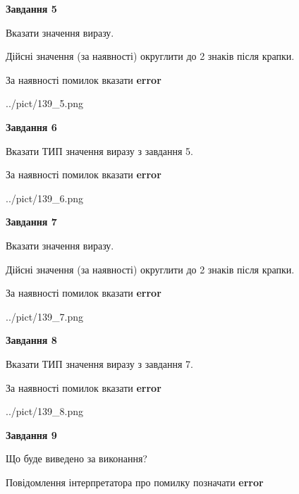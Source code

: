 \documentclass[11pt, ukrainian]{article}
\begin{document}
{\begin {large}
{\begin {center}\textbf{Завдання 5}\end {center}}\par
Вказати значення виразу. \par
Дійсні значення (за наявності) округлити до 2 знаків після крапки. \par
За наявності помилок вказати \textbf{error}

\begin{center}
	{../pict/139_5.png}
\end{center}
\newpage

{\begin {center}\textbf{Завдання 6}\end {center}}\par
Вказати ТИП значення виразу з завдання 5. \par
За наявності помилок вказати \textbf{error}

\begin{center}
	{../pict/139_6.png}
\end{center}
\newpage

{\begin {center}\textbf{Завдання 7}\end {center}}\par
Вказати значення виразу. \par
Дійсні значення (за наявності) округлити до 2 знаків після крапки. \par
За наявності помилок вказати \textbf{error}

\begin{center}
	{../pict/139_7.png}
\end{center}
\newpage

{\begin {center}\textbf{Завдання 8}\end {center}}\par
Вказати ТИП значення виразу з завдання 7. \par
За наявності помилок вказати \textbf{error}

\begin{center}
	{../pict/139_8.png}
\end{center}
\newpage

{\begin {center}\textbf{Завдання 9}\end {center}}\par
Що буде виведено за виконання? \par
Повідомлення інтерпретатора про помилку позначати \textbf{error}


\end{large}}
\end{document}
